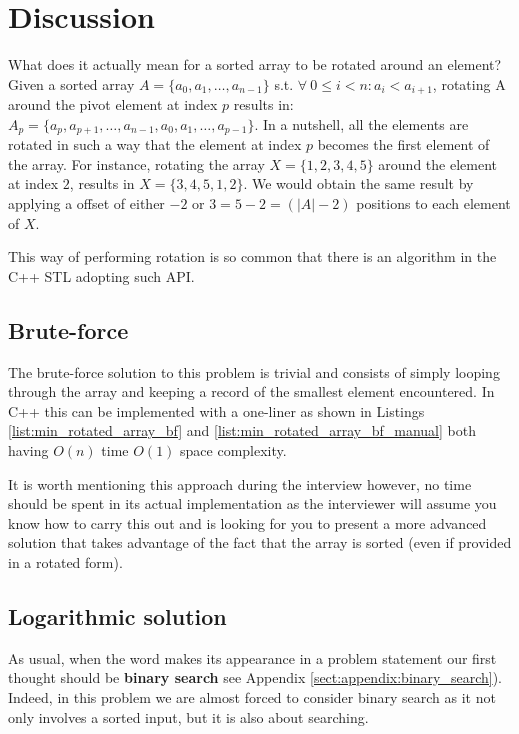 \section{Discussion}
\label{min_rotated_array:sec:discussion}
What does it actually mean for a sorted array to be rotated around an element? Given a sorted array $A=\{a_0, a_1, \ldots,a_{n-1}\}$ s.t. $ \forall \: 0 \leq i < n: a_i < a_{i+1}$, rotating A around the pivot element at index $p$ results in: $A_p=\{a_p, a_{p+1}, \ldots,a_{n-1}, a_0, a_1, \ldots, a_{p-1}\}$. In a nutshell, all the elements are rotated in such a way that the element at index $p$ becomes the first element of the array. For instance, rotating the array $X=\{1,2,3,4,5\}$ around the element at index $2$, results in $X=\{3,4,5,1,2\}$. We would obtain the same result by applying a offset of either $-2$ or $3=5-2=(|A|-2)$ positions to each element of $X$. 

This way of performing rotation is so common that there is an algorithm in the C++ STL\cite{cit::std::rotate} adopting such API.

\subsection{Brute-force}
\label{min_rotated_array:sec:bruteforce}
The brute-force solution to this problem is trivial and consists of simply looping through the array and keeping a record of the smallest element encountered.
In C++ this can be implemented with a one-liner as shown in Listings \ref{list:min_rotated_array_bf} and \ref{list:min_rotated_array_bf_manual} both having $O(n)$ time $O(1)$ space complexity.





It is worth mentioning this approach during the interview however, no time should be spent in its actual implementation as the interviewer will assume you know how to carry this out and is looking for you to present a more advanced solution that takes advantage of the fact that the array is sorted (even if provided in a rotated form).


\subsection{Logarithmic solution}
\label{min_rotated_array:sec:log}
As usual, when the word \textit{} makes its appearance in a problem statement our first thought should be \textbf{binary search} see Appendix \ref{sect:appendix:binary_search}). Indeed, in this problem we are almost forced to consider binary search as it not only involves a sorted input, but it is also about searching. 

